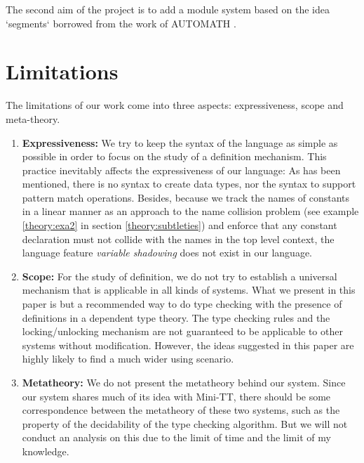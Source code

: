 The second aim of the project is to add a module system based on the idea `segments` borrowed from the work of AUTOMATH \cite{de1994survey}.

\section{Limitations}
The limitations of our work come into three aspects: expressiveness, scope and meta-theory.
\begin{enumerate}
\item \textbf{Expressiveness:} We try to keep the syntax of the language as simple as possible in order to focus on the study of a definition mechanism. This practice inevitably affects the expressiveness of our language: As has been mentioned, there is no syntax to create data types, nor the syntax to support pattern match operations. Besides, because we track the names of constants in a linear manner as an approach to the name collision problem (see example \ref{theory:exa2} in section \ref{theory:subtleties}) and enforce that any constant declaration must not collide with the names in the top level context, the language feature \emph{variable shadowing} does not exist in our language.
\item \textbf{Scope:} For the study of definition, we do not try to establish a universal mechanism that is applicable in all kinds of systems. What we present in this paper is but a recommended way to do type checking with the presence of definitions in a dependent type theory. The type checking rules and the locking/unlocking mechanism are not guaranteed to be applicable to other systems without modification. However, the ideas suggested in this paper are highly likely to find a much wider using scenario. 
\item \textbf{Metatheory:} We do not present the metatheory behind our system. Since our system shares much of its idea with Mini-TT, there should be some correspondence between the metatheory of these two systems, such as the property of the decidability of the type checking algorithm. But we will not conduct an analysis on this due to the limit of time and the limit of my knowledge.
\end{enumerate}


